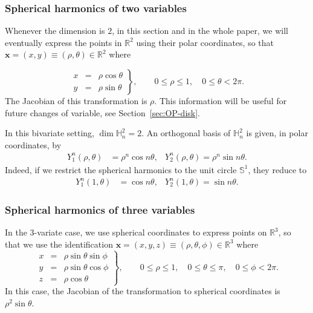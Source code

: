 \documentclass[a4paper]{article}
\theoremstyle{plain}
\theoremstyle{definition}
\newcommand{\RR}{\mathbb{R}}
\begin{document}
    \subsubsection{Spherical harmonics of two variables}\label{subsubsec:sph-harm-2}

    Whenever the dimension is $2$, in this section and in the whole paper, we will eventually express the points in $\RR^2$ using their polar coordinates, so that $\mathbf x = (x,y)\equiv(\rho,\theta)\in \RR^2$ where
    
    \begin{equation}
    \label{eq:polar-coordinates}
    \left.\begin{array}{rcl}
         x & = & \rho \cos\theta  \\
         y & = & \rho \sin\theta 
    \end{array}\right\}, \qquad 0\leq \rho\leq 1, \quad 0\leq \theta<2 \pi.
    \end{equation}
    The Jacobian of this transformation is $\rho$. This information will be useful for future changes of variable, see Section~\ref{sec:OP-disk}.
    
    
    In this bivariate setting, $\dim \mathbb H_n^2 = 2$. An orthogonal basis of $\mathbb H_n^2$ is given, in polar coordinates, by \cite[Section 1.6.1]{FX13}
    \begin{align}\label{eq:harmonics-2-var}
        Y_1^n(\rho,\theta) &= \rho^n \cos n\theta, & Y_2^n(\rho,\theta)=\rho^n\sin n\theta.        
    \end{align}
    Indeed, if we restrict the spherical harmonics to the unit circle $\mathbb S^1$, they reduce to
    \begin{align}\label{eq:harmonics-2-var-circle}
        Y_1^n(1,\theta) &= \cos n\theta, & Y_2^n(1,\theta)=\sin n\theta.    
    \end{align}

    \subsubsection{Spherical harmonics of three variables}\label{subsubsec:sph-harm-3}
    

    In the $3$-variate case, we use spherical coordinates to express points on $\RR^3$, so that we use the identification $\mathbf{x}=(x,y,z)\equiv(\rho,\theta,\phi)\in \RR^3$ where
    \begin{equation}
    \label{eq:sph-coordinates}
    \left.\begin{array}{rcl}
         x & = & \rho \sin\theta\sin\phi  \\
         y & = & \rho \sin\theta\cos\phi  \\
         z & = & \rho \cos\theta
    \end{array}\right\}, \qquad 0\leq \rho\leq 1, \quad 0\leq \theta\leq\pi,\quad 0\leq\phi<2 \pi.
    \end{equation}
    In this case, the Jacobian of the transformation to spherical coordinates is $\rho^2\sin\theta$.
    
\end{document}
